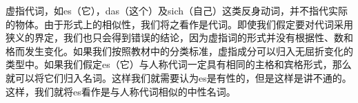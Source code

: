 虚指代词，如es（它），das（这个）及sich（自己）这类反身动词，并不指代实际的物体。由于形式上的相似性，我们将之看作是代词。即使我们假定要对代词采用狭义的界定，我们也只会得到错误的结论，因为虚指词的形式并没有根据性、数和格而发生变化。如果我们按照教材中的分类标准，虚指成分可以归入无屈折变化的类型中。如果我们假定es（它）与人称代词一定具有相同的主格和宾格形式，那么就可以将它们归入名词。这样我们就需要认为es是有性的，但是这样是讲不通的。这样，我们就将es看作是与人称代词相似的中性名词。

